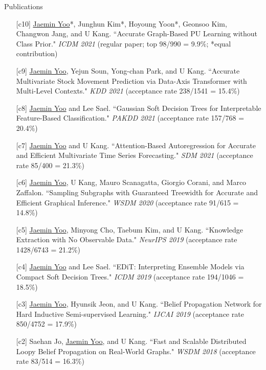 \documentclass{resume} %
\begin{document}
\begin{rSection}{Publications}
\smallskip
\begin{enumerate}

	\item[{[c10]}] \underline{Jaemin Yoo}*, Junghun Kim*, Hoyoung Yoon*, Geonsoo Kim, Changwon Jang, and U Kang.
		``Accurate Graph-Based PU Learning without Class Prior."
		\emph{ICDM 2021} (regular paper; top 98/990 = 9.9\%; *equal contribution)

	\item[{[c9]}] \underline{Jaemin Yoo}, Yejun Soun, Yong-chan Park, and U Kang.
		``Accurate Multivariate Stock Movement Prediction via Data-Axis Transformer with Multi-Level Contexts."
		\emph{KDD 2021} (acceptance rate 238/1541 = 15.4\%)

	\item[{[c8]}] \underline{Jaemin Yoo} and Lee Sael.
		``Gaussian Soft Decision Trees for Interpretable Feature-Based Classification."
		\emph{PAKDD 2021} (acceptance rate 157/768 = 20.4\%)
		
	\item[{[c7]}] \underline{Jaemin Yoo} and U Kang.
		``Attention-Based Autoregression for Accurate and Efficient Multivariate Time Series Forecasting."
		\emph{SDM 2021} (acceptance rate 85/400 = 21.3\%)

	\item[{[c6]}] \underline{Jaemin Yoo}, U Kang, Mauro Scanagatta, Giorgio Corani, and Marco Zaffalon.
		``Sampling Subgraphs with Guaranteed Treewidth for Accurate and Efficient Graphical Inference."
		\emph{WSDM 2020} (acceptance rate 91/615 = 14.8\%)

	\item[{[c5]}] \underline{Jaemin Yoo}, Minyong Cho, Taebum Kim, and U Kang.
		``Knowledge Extraction with No Observable Data."
		\emph{NeurIPS 2019} (acceptance rate 1428/6743 = 21.2\%)

	\item[{[c4]}] \underline{Jaemin Yoo} and Lee Sael.
		``EDiT: Interpreting Ensemble Models via Compact Soft Decision Trees."
		\emph{ICDM 2019} (acceptance rate 194/1046 = 18.5\%)

	\item[{[c3]}] \underline{Jaemin Yoo}, Hyunsik Jeon, and U Kang.
		``Belief Propagation Network for Hard Inductive Semi-supervised Learning."
		\emph{IJCAI 2019} (acceptance rate 850/4752 = 17.9\%)

	\item[{[c2]}] Saehan Jo, \underline{Jaemin Yoo}, and U Kang.
		``Fast and Scalable Distributed Loopy Belief Propagation on Real-World Graphs."
		\emph{WSDM 2018} (acceptance rate 83/514 = 16.3\%)


\end{enumerate}
\end{rSection}
\end{document}
